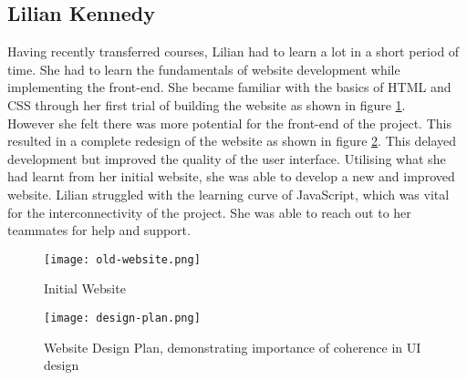 \subsection{Lilian Kennedy}
Having recently transferred courses, Lilian had to learn a lot in a short period of time. She had to learn the fundamentals of website development while implementing the front-end. She became familiar with the basics of HTML and CSS through her first trial of building the website as shown in figure \ref{fig:initial}. \\

However she felt there was more potential for the front-end of the project. This resulted in a complete redesign of the website as shown in figure \ref{fig:plan}. This delayed development but improved the quality of the user interface. Utilising what she had learnt from her initial website, she was able to develop a new and improved website. Lilian struggled with the learning curve of JavaScript, which was vital for the interconnectivity of the project. She was able to reach out to her teammates for help and support.\\


\begin{figure}[!ht]
    \texttt{[image: old-website.png]}\\
    \caption{Initial Website}
    \label{fig:initial}
\end{figure}

\newpage

\begin{figure}[!ht]
    \texttt{[image: design-plan.png]}\\
    \caption{Website Design Plan, demonstrating importance of coherence in UI design}
    \label{fig:plan}
\end{figure}
